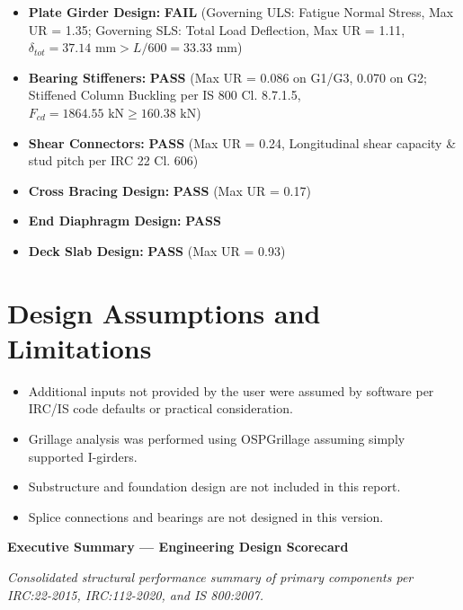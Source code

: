 \documentclass[12pt,a4paper]{report}
\numberwithin{table}{chapter}
\numberwithin{figure}{chapter}
\newcommand{\passBadge}{\colorbox{passBg}{\textcolor{passGreen}{\textbf{PASS}}}}
\newcommand{\failBadge}{\colorbox{failBg}{\textcolor{failRed}{\textbf{FAIL}}}}
\begin{document}
\begin{itemize}
\item \textbf{Plate Girder Design:} \failBadge{} (Governing ULS: Fatigue Normal Stress, Max UR = 1.35; Governing SLS: Total Load Deflection, Max UR = 1.11, $\delta_{tot} = 37.14\text{ mm} > L/600 = 33.33\text{ mm}$)
\item \textbf{Bearing Stiffeners:} \passBadge{} (Max UR = 0.086 on G1/G3, 0.070 on G2; Stiffened Column Buckling per IS 800 Cl. 8.7.1.5, $F_{cd} = 1864.55\text{ kN} \ge 160.38\text{ kN}$)
\item \textbf{Shear Connectors:} \passBadge{} (Max UR = 0.24, Longitudinal shear capacity \& stud pitch per IRC 22 Cl. 606)
\item \textbf{Cross Bracing Design:} \passBadge{} (Max UR = 0.17)
\item \textbf{End Diaphragm Design:} \passBadge{}
\item \textbf{Deck Slab Design:} \passBadge{} (Max UR = 0.93)
\end{itemize}

\section*{Design Assumptions and Limitations}
\label{sec:assumptions}

\begin{itemize}
\item Additional inputs not provided by the user were assumed by software per IRC/IS code defaults or practical consideration.
\item Grillage analysis was performed using OSPGrillage assuming simply supported I-girders.
\item Substructure and foundation design are not included in this report.
\item Splice connections and bearings are not designed in this version.
\end{itemize}

\newpage
{\centering\Large\bfseries Executive Summary --- Engineering Design Scorecard\par}
\label{sec:scorecard}
\vspace{0.4em}
{\centering\small\textit{Consolidated structural performance summary of primary components per IRC:22-2015, IRC:112-2020, and IS 800:2007.}\par}
\vspace{0.8em}
\end{document}
